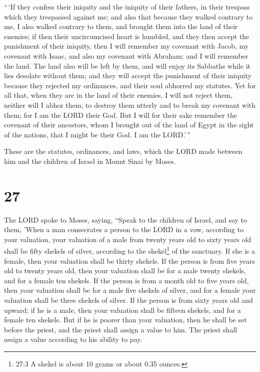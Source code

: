  ``\,`If they confess their iniquity and the iniquity of
their fathers, in their trespass which they trespassed against me; and
also that because they walked contrary to me,  I also
walked contrary to them, and brought them into the land of their
enemies; if then their uncircumcised heart is humbled, and they then
accept the punishment of their iniquity,  then I will
remember my covenant with Jacob, my covenant with Isaac, and also my
covenant with Abraham; and I will remember the land.  The
land also will be left by them, and will enjoy its Sabbaths while it
lies desolate without them; and they will accept the punishment of their
iniquity because they rejected my ordinances, and their soul abhorred my
statutes.  Yet for all that, when they are in the land of
their enemies, I will not reject them, neither will I abhor them, to
destroy them utterly and to break my covenant with them; for I am the
LORD their God.  But I will for their sake remember the
covenant of their ancestors, whom I brought out of the land of Egypt in
the sight of the nations, that I might be their God. I am the LORD.'\,''

 These are the statutes, ordinances, and laws, which the
LORD made between him and the children of Israel in Mount Sinai by
Moses.

\hypertarget{section-26}{%
\section{27}\label{section-26}}

 The LORD spoke to Moses, saying,  ``Speak to
the children of Israel, and say to them, 'When a man consecrates a
person to the LORD in a vow, according to your valuation, 
your valuation of a male from twenty years old to sixty years old shall
be fifty shekels of silver, according to the shekel\footnote{27:3 A
  shekel is about 10 grams or about 0.35 ounces.} of the sanctuary.
 If she is a female, then your valuation shall be thirty
shekels.  If the person is from five years old to twenty
years old, then your valuation shall be for a male twenty shekels, and
for a female ten shekels.  If the person is from a month old
to five years old, then your valuation shall be for a male five shekels
of silver, and for a female your valuation shall be three shekels of
silver.  If the person is from sixty years old and upward;
if he is a male, then your valuation shall be fifteen shekels, and for a
female ten shekels.  But if he is poorer than your
valuation, then he shall be set before the priest, and the priest shall
assign a value to him. The priest shall assign a value according to his
ability to pay.

